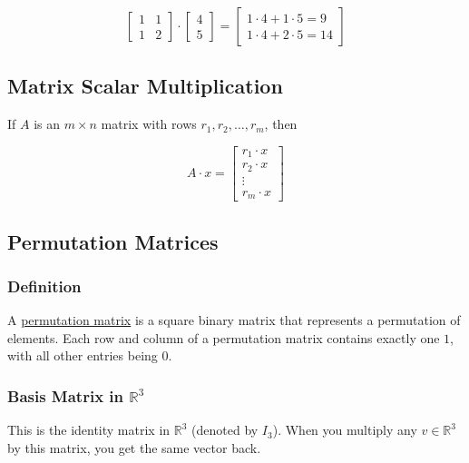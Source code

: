 \documentclass[12pt]{article}
\begin{document}
\begin{equation}
  \begin{bmatrix} 1 & 1 \\ 1 & 2 \end{bmatrix}
  \cdot
  \begin{bmatrix} 4 \\ 5 \end{bmatrix} 
  =
  \begin{bmatrix} 
    1 \cdot 4 + 1 \cdot 5 = 9 \\
    1 \cdot 4 + 2 \cdot 5 = 14
  \end{bmatrix} 
\end{equation}

\subsection{Matrix Scalar Multiplication}

If $A$ is an $m \times n$ matrix with rows $r_{1}, r_{2}, \dots, r_{m}$, then

\begin{equation}
  A \cdot x = 
  \begin{bmatrix} 
    r_{1} \cdot x \\
    r_{2} \cdot x \\
    \vdots \\
    r_{m} \cdot x
  \end{bmatrix}
\end{equation}

\subsection{Permutation Matrices}

\subsubsection{Definition}

A \underline{permutation matrix} is a square binary matrix that represents
a permutation of elements. Each row and column of a permutation matrix contains
exactly one $1$, with all other entries being $0$.

\subsubsection{Basis Matrix in $\mathbb{R}^{3}$}

This is the identity matrix in $\mathbb{R}^{3}$ (denoted by $I_{3}$). When you 
multiply any $v \in \mathbb{R}^{3}$ by this matrix, you get the same vector back.
\end{document}
